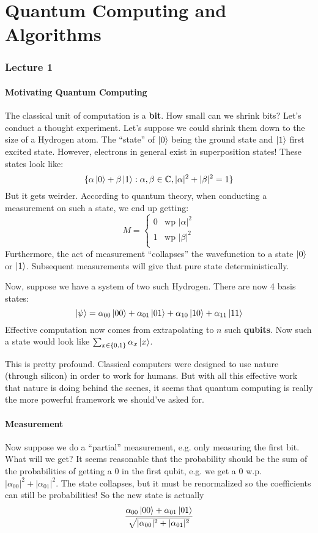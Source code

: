 \part{Quantum Computing and Algorithms}
\section{Lecture 1}

\subsection{Motivating Quantum Computing}
The classical unit of computation is a \textbf{bit}. How small can we shrink bits? Let's conduct a thought experiment. Let's suppose we could shrink them down to the size of a Hydrogen atom. The ``state''
of $\ket{0}$ being the ground state and $\ket{1}$ first excited state. However, electrons in general exist in superposition states! These states look like:
\[ \{ \alpha \ket{0} + \beta \ket{1}: \alpha, \beta \in \operatorname{\mathbb{C}}, |\alpha|^2 + |\beta|^2 = 1 \} \]
But it gets weirder. According to quantum theory, when conducting a measurement on such a state, we end up getting:
\[ M = \begin{cases}
   0 & \text{wp } |\alpha|^2 \\
    1 & \text{wp } |\beta|^2 \\
\end{cases} \]
Furthermore, the act of measurement ``collapses'' the wavefunction to a state $\ket{0}$ or $\ket{1}$. Subsequent measurements will give that pure state deterministically.

Now, suppose we have a system of two such Hydrogen. There are now 4 basis states:
\[ \ket{\psi} = \alpha_{00} \ket{00} + \alpha_{01} \ket{01} + \alpha_{10} \ket{10} + \alpha_{11} \ket{11} \]
Effective computation now comes from extrapolating to $n$ such \textbf{qubits}. Now such a state would look like $\sum_{x \in \{0, 1\}} \alpha_x \ket{x}$.

This is pretty profound. Classical computers were designed to use nature (through silicon) in order to work for humans. But with all
this effective work that nature is doing behind the scenes, it seems that quantum computing is really the more powerful framework we should've asked for.

\subsection{Measurement}
Now suppose we do a ``partial'' measurement, e.g. only measuring the first bit. What will we get? It seems reasonable that the probability should be the sum of the probabilities of getting a 0 in the first qubit,
e.g. we get a 0 w.p. $|\alpha_{00}|^2 + |\alpha_{01}|^2$. The state collapses, but it must be renormalized so the coefficients can still be probabilities!
So the new state is actually \[\frac{\alpha_{00} \ket{00} + \alpha_{01} \ket{01}}{\sqrt{|\alpha_{00}|^2 + |\alpha_{01}|^2}}\]

